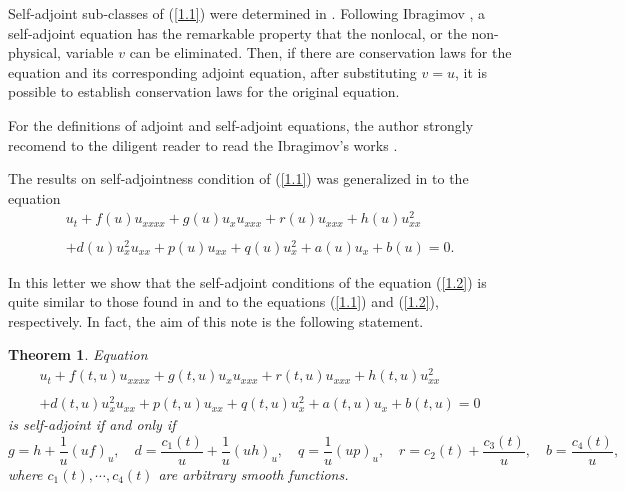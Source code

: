 \documentclass[11pt,letterpaper,twoside]{article}
\newcommand{\f}{\frac}
\newtheorem{theorem}{Theorem}
\newcommand{\bb}{\begin{equation}}
\newcommand{\ee}{\end{equation}}
\newcommand{\ba}{\begin{array}}
\newcommand{\ea}{\end{array}}
\begin{document}
Self-adjoint sub-classes of (\ref{1.1}) were determined in \cite{ib1}. Following Ibragimov \cite{ib3}, a self-adjoint equation has the remarkable property that the nonlocal, or the non-physical, variable $v$ can be eliminated. Then, if there are conservation laws for the equation and its corresponding adjoint equation, after substituting $v=u$, it is possible to establish conservation laws for the original equation. 

For the definitions of adjoint and self-adjoint equations, the author strongly recomend to the diligent reader to read the Ibragimov's works \cite{ib2,ib3,ib4}.

The results on self-adjointness condition of (\ref{1.1}) was generalized in \cite{i1} to the equation
\bb\label{1.2}
\ba{l}
u_{t}+f(u)u_{xxxx}+g(u)u_{x}u_{xxx}+r(u)u_{xxx}+h(u)u_{xx}^{2}\\
\\
+d(u)u_{x}^{2}u_{xx}+p(u)u_{xx}+q(u)u_{x}^{2}+a(u)u_{x}+b(u)=0.
\ea
\ee

In this letter we show that the self-adjoint conditions of the equation (\ref{1.2}) is quite similar to those found in \cite{ib1} and \cite{i1} to the equations (\ref{1.1}) and (\ref{1.2}), respectively. In fact, the aim of this note is the following statement.

\begin{theorem}\label{teo1}
Equation 
\bb\label{1.3}
\ba{l}
u_{t}+f(t,u)u_{xxxx}+g(t,u)u_{x}u_{xxx}+r(t,u)u_{xxx}+h(t,u)u_{xx}^{2}\\
\\
+d(t,u)u_{x}^{2}u_{xx}+p(t,u)u_{xx}+q(t,u)u_{x}^{2}+a(t,u)u_{x}+b(t,u)=0
\ea
\ee
is self-adjoint if and only if
\bb\label{1.4}
g=h+\f{1}{u}(uf)_{u},\,\,\,\,\,\,d=\f{c_{1}(t)}{u}+\f{1}{u}(uh)_{u},\,\,\,\,\,\,q=\f{1}{u}(up)_{u},\,\,\,\,\,\,r=c_{2}(t)+\f{c_{3}(t)}{u},\,\,\,\,\,\,b=\f{c_{4}(t)}{u},
\ee
where  $c_{1}(t),\cdots,c_{4}(t)$ are arbitrary smooth functions. 
\end{theorem}
\end{document}
